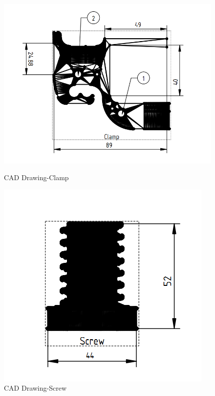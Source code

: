 \documentclass[11pt, a4paper, openany]{book}
\begin{document}
\begin{figure}[H]
  \centering
  \begin{minipage}[b]{0.4\textwidth}
  \begin{center}
    \includegraphics[scale=0.43]{Labbot&ele/n1.png}
    \caption{CAD Drawing-Clamp\cite{Github}}
    \label{fig:CAD1} 
      \end{center}
  \end{minipage}
  \hfill
  \begin{minipage}[b]{0.4\textwidth}
  \includegraphics[scale=0.45]{Labbot&ele/n2.png}
    \caption{CAD Drawing-Screw \cite{Github}}
    \label{fig:CAD2} 
  \end{minipage}
\end{figure}
\end{document}
